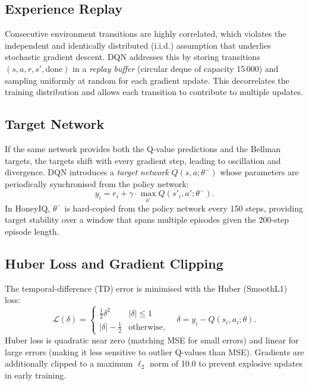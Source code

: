 \subsection{Experience Replay}

Consecutive environment transitions are highly correlated, which violates
the independent and identically distributed (i.i.d.) assumption that
underlies stochastic gradient descent.
DQN addresses this by storing transitions $(s, a, r, s', \text{done})$ in
a \emph{replay buffer} (circular deque of capacity 15\,000) and sampling
uniformly at random for each gradient update.
This decorrelates the training distribution and allows each transition to
contribute to multiple updates.

\subsection{Target Network}

If the same network provides both the Q-value predictions and the
Bellman targets, the targets shift with every gradient step, leading
to oscillation and divergence.
DQN introduces a \emph{target network} $Q(s, a; \theta^-)$ whose parameters
are periodically synchronised from the policy network:
%
\begin{equation}
  y_i = r_i + \gamma \cdot \max_{a'} Q(s'_i, a'; \theta^-).
  \label{eq:td_target}
\end{equation}
%
In HoneyIQ, $\theta^-$ is hard-copied from the policy network every
150 steps, providing target stability over a window that spans multiple
episodes given the 200-step episode length.

\subsection{Huber Loss and Gradient Clipping}

The temporal-difference (TD) error is minimised with the Huber (SmoothL1)
loss:
%
\begin{equation}
  \mathcal{L}(\delta) =
  \begin{cases}
    \tfrac{1}{2}\delta^2 & |\delta| \le 1 \\
    |\delta| - \tfrac{1}{2} & \text{otherwise,}
  \end{cases}
  \quad \delta = y_i - Q(s_i, a_i; \theta).
\end{equation}
%
Huber loss is quadratic near zero (matching MSE for small errors) and linear
for large errors (making it less sensitive to outlier Q-values than MSE).
Gradients are additionally clipped to a maximum $\ell_2$ norm of 10.0 to
prevent explosive updates in early training.

